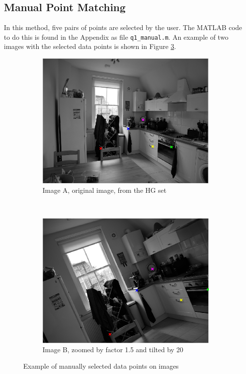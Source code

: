 \documentclass[a4paper, 10pt, conference]{ieeeconf}
\begin{document}
\subsection{Manual Point Matching}

In this method, five pairs of points are selected by the user. The MATLAB code to do this is found in the Appendix as file \texttt{q1\_manual.m}. An example of two images with the selected data points is shown in Figure \ref{fig:manual}.

\begin{figure}[!ht]
  \captionsetup[subfigure]{position=b}
  \centering
    \begin{subfigure}{0.45\linewidth}
      \includegraphics[width=\textwidth]{pic/manualA}
      \caption{Image A, original image, from the HG set}
      \label{fig:manualA}
    \end{subfigure}
    ~
    \begin{subfigure}{0.45\linewidth}
      \includegraphics[width=\textwidth]{pic/manualB}
      \caption{Image B, zoomed by factor 1.5 and tilted by 20\degree}
      \label{fig:manualB}
    \end{subfigure}

	\caption{Example of manually selected data points on images}
    \vspace{-0.75cm}
  \label{fig:manual}
\end{figure}
\end{document}
